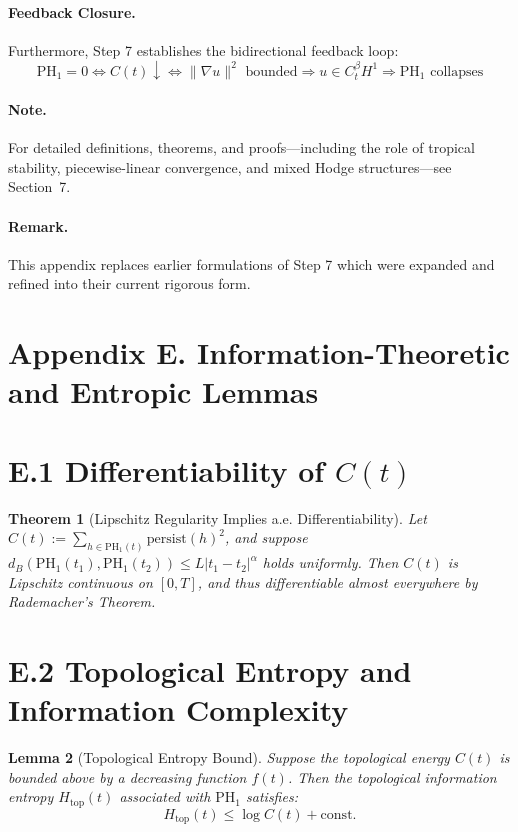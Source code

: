 \documentclass[11pt]{article}
\newtheorem{theorem}{Theorem}[section]
\newtheorem{lemma}[theorem]{Lemma}
\theoremstyle{definition}
\begin{document}
\paragraph{Feedback Closure.}
Furthermore, Step 7 establishes the bidirectional feedback loop:
\[
\mathrm{PH}_1 = 0 \Leftrightarrow C(t) \downarrow \Leftrightarrow \|\nabla u\|^2 \text{ bounded} \Rightarrow u \in C^{\beta}_t H^1 \Rightarrow \mathrm{PH}_1 \text{ collapses}
\]

\paragraph{Note.} For detailed definitions, theorems, and proofs—including the role of tropical stability, piecewise-linear convergence, and mixed Hodge structures—see Section~7.

\paragraph{Remark.} This appendix replaces earlier formulations of Step 7 which were expanded and refined into their current rigorous form.


\section*{Appendix E. Information-Theoretic and Entropic Lemmas}
\label{sec:appendixE}

\section*{E.1 Differentiability of $C(t)$}
\begin{theorem}[Lipschitz Regularity Implies a.e. Differentiability]
Let $C(t) := \sum_{h \in \mathrm{PH}_1(t)} \mathrm{persist}(h)^2$, and suppose $d_B(\mathrm{PH}_1(t_1), \mathrm{PH}_1(t_2)) \leq L |t_1 - t_2|^\alpha$ holds uniformly. Then $C(t)$ is Lipschitz continuous on $[0,T]$, and thus differentiable almost everywhere by Rademacher’s Theorem.
\end{theorem}

\section*{E.2 Topological Entropy and Information Complexity}
\begin{lemma}[Topological Entropy Bound]
Suppose the topological energy $C(t)$ is bounded above by a decreasing function $f(t)$. Then the topological information entropy $H_\text{top}(t)$ associated with $\mathrm{PH}_1$ satisfies:
\[
H_\text{top}(t) \leq \log C(t) + \text{const}.
\]
\end{lemma}
\end{document}
